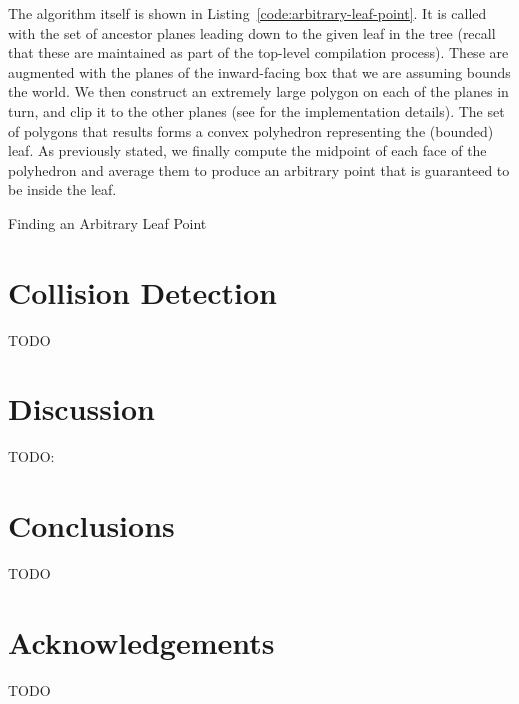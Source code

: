 \documentclass[10pt,twocolumn]{article}
\begin{document}
The algorithm itself is shown in Listing~\ref{code:arbitrary-leaf-point}. It is called with the set of ancestor planes leading down to the given leaf in the tree (recall that these are maintained as part of the top-level compilation process). These are augmented with the planes of the inward-facing box that we are assuming bounds the world. We then construct an extremely large polygon on each of the planes in turn, and clip it to the other planes (see \cite{hesperus} for the implementation details). The set of polygons that results forms a convex polyhedron representing the (bounded) leaf. As previously stated, we finally compute the midpoint of each face of the polyhedron and average them to produce an arbitrary point that is guaranteed to be inside the leaf.

\begin{stulisting}[!t]
\caption{Finding an Arbitrary Leaf Point}
\label{code:arbitrary-leaf-point}

\end{stulisting}

\section{Collision Detection}
\label{sec:collisiondetection}

TODO

\section{Discussion}
\label{sec:discussion}

TODO: \cite{melax00}

\section{Conclusions}
\label{sec:conclusions}

TODO

\section{Acknowledgements}

TODO

%
%

\clearpage




\end{document}

